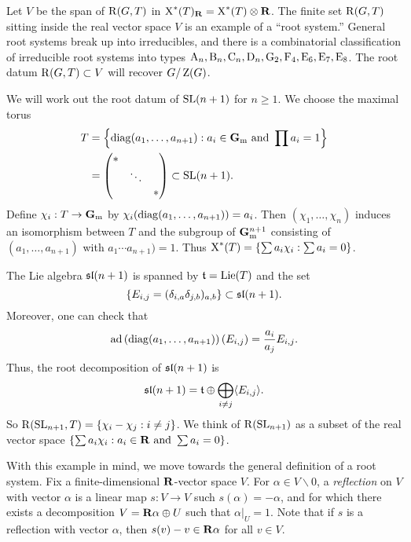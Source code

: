 Let $V$ be the span of $\operatorname{R}(G,T)$ in 
$\operatorname{X}^\ast(T)_{\mathbf{R}}=\operatorname{X}^\ast(T)\otimes\mathbf{R}$. The finite set 
$\operatorname{R}(G,T)$ sitting inside the real vector space $V$ is an example of a 
``root system.'' General root systems break up into irreducibles, and there is 
a combinatorial classification of irreducible root systems into 
types 
$\mathrm{A}_n,\mathrm{B}_n,\mathrm{C}_n,\mathrm{D}_n,\mathrm{G}_2,\mathrm{F}_4,\mathrm{E}_6,\mathrm{E}_7,\mathrm{E}_8$. 
The root datum $\operatorname{R}(G,T)\subset V$ will recover $G/\operatorname{Z}(G)$. 





\begin{example}\label{eg:root-sln}
We will work out the root datum of $\operatorname{SL}(n+1)$ for $n\geqslant 1$. We choose 
the maximal torus 
\begin{align*}
  T &= \left\{\operatorname{diag}(a_1,\dots,a_{n+1}):a_i\in \mathbf{G}_\mathrm{m}\text{ and }\prod a_i=1\right\} \\
  &= \begin{pmatrix} \ast \\ & \ddots \\ & & \ast \end{pmatrix} \subset \operatorname{SL}(n+1) .
\end{align*}
Define $\chi_i:T\to \mathbf{G}_\mathrm{m}$ by $\chi_i(\operatorname{diag}(a_1,\dots,a_{n+1}))=a_i$. Then 
$(\chi_1,\dots,\chi_n)$ induces an isomorphism between $T$ and the subgroup of 
$\mathbf{G}_\mathrm{m}^{n+1}$ consisting of $(a_1,\dots,a_{n+1})$ with $a_1\dotsm a_{n+1})=1$. 
Thus $\operatorname{X}^\ast(T)=\{\sum a_i \chi_i:\sum a_i=0\}$. 

The Lie algebra $\mathfrak{sl}(n+1)$ is spanned by $\mathfrak{t}=\operatorname{Lie}(T)$ and the set 
\[
  \left\{E_{i,j} = (\delta_{i,a}\delta_{j,b})_{a,b}\right\} \subset \mathfrak{sl}(n+1) .
\]
Moreover, one can check that 
\[
  \operatorname{ad}\left(\operatorname{diag}(a_1,\dots,a_{n+1})\right)(E_{i,j}) = \frac{a_i}{a_j} E_{i,j} .
\]
Thus, the root decomposition of $\mathfrak{sl}(n+1)$ is 
\[
  \mathfrak{sl}(n+1) = \mathfrak{t}\oplus \bigoplus_{i\ne j} \langle E_{i,j}\rangle .
\]
So $\operatorname{R}(\operatorname{SL}_{n+1},T) = \{\chi_i-\chi_j:i\ne j\}$. We think 
of $\operatorname{R}(\operatorname{SL}_{n+1})$ as a subset of the real vector space 
$\{\sum a_i \chi_i:a_i\in \mathbf{R}\text{ and }\sum a_i=0\}$. 
\end{example}

With this example in mind, we move towards the general definition of a root 
system. Fix a finite-dimensional $\mathbf{R}$-vector space $V$. For 
$\alpha\in V\smallsetminus 0$, a \emph{reflection} on $V$ with vector $\alpha$ 
is a linear map $s:V\to V$ such $s(\alpha)=-\alpha$, and for which there exists 
a decomposition $V=\mathbf{R}\alpha\oplus U$ such that $\alpha|_U=1$. Note that if 
$s$ is a reflection with vector $\alpha$, then $s(v)-v\in \mathbf{R}\alpha$ for all 
$v\in V$. 

